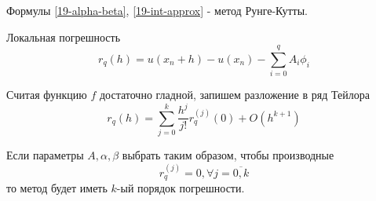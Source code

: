 \begin{definition}
  Формулы \eqref{19-alpha-beta}, \eqref{19-int-approx} - метод Рунге-Кутты.
\end{definition}

Локальная погрешность
\begin{equation}
  r_q(h) = u(x_n + h) - u(x_n) - \sum\limits_{i = 0}^qA_i\phi_i
\end{equation}

Считая функцию $f$ достаточно гладной, запишем разложение в ряд Тейлора
\begin{equation}
  r_q(h) = \sum\limits_{j = 0}^k\dfrac{h^j}{j!}r_q^{(j)}(0) + O(h^{k + 1})
\end{equation}

Если параметры $A, \alpha, \beta$ выбрать таким образом, чтобы производные
\begin{equation}
  \label{19-precision}
  r_q^{(j)} = 0, \forall j = \overline{0, k}
\end{equation}
то метод будет иметь $k$-ый порядок погрешности.

